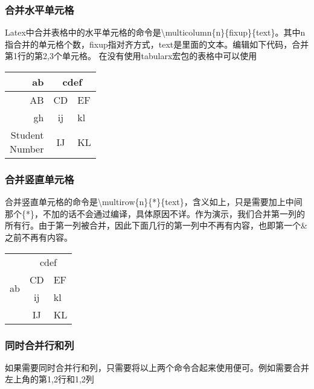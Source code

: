     \subsubsection{合并水平单元格}

      Latex中合并表格中的水平单元格的命令是\textbackslash multicolumn\{n\}\{fixup\}\{text\}。其中n指合并的单元格个数，fixup指对齐方式，text是里面的文本。编辑如下代码，合并第1行的第2,3个单元格。
      在没有使用tabularx宏包的表格中可以使用

    \begin{center}
      \begin{tabular}{|r|c|l|}
        \hline
        ab&\multicolumn{2}{|c|}{cdef}\\
        \hline
        AB&CD&EF\\
        \hline
        gh&ij&kl\\
        \hline
        \makecell[r]{Student \\ Number}&IJ&KL\\
        \hline
      \end{tabular}
    \end{center}

    \subsubsection{合并竖直单元格}

    合并竖直单元格的命令是\textbackslash multirow\{n\}\{*\}\{text\}，含义如上，只是需要加上中间那个\{*\}，不加的话不会通过编译，具体原因不详。作为演示，我们合并第一列的所有行。由于第一列被合并，因此下面几行的第一列中不再有内容，也即第一个\&之前不再有内容。
      
    \begin{center}
      \begin{tabular}{|r|c|l|}
        \hline
        \multirow{4}{*}{ab} & \multicolumn{2}{|c|}{cdef}\\
                            \cline{2-3}
                            & CD & EF\\
                            \cline{2-3}
                            & ij & kl\\
                            \cline{2-3}
                            & IJ & KL\\
        \hline
      \end{tabular}
    \end{center}

      \subsubsection{同时合并行和列}
      如果需要同时合并行和列，只需要将以上两个命令合起来使用便可。例如需要合并左上角的第1,2行和1,2列

